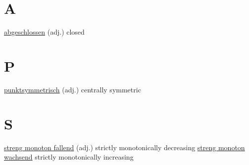 \documentclass[a4paper,8pt,twocolumn]{extbook}
\begin{document}
\section{A}
\underline{abgeschlossen} (adj.) closed
\section{P}
\underline{punktsymmetrisch} (adj.) centrally symmetric
\section{S}
\underline{streng monoton fallend} (adj.) strictly monotonically decreasing
\underline{streng monoton wachsend} strictly monotonically increasing
\end{document}
